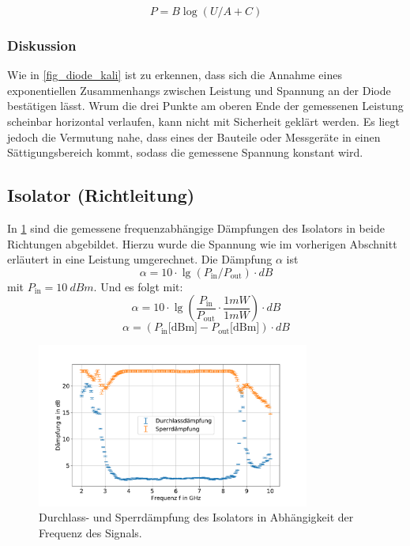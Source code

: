 \documentclass[
	a4paper,
	12pt,
	pagesize,
	ngerman
]{scrartcl}
\begin{document}
	\begin{equation}
		\label{eq_inv_kali}
		P = B\log{(U/A+C)}
	\end{equation}
	\subsubsection*{Diskussion}

	Wie in \cref{fig_diode_kali} ist zu erkennen, dass sich die Annahme eines exponentiellen Zusammenhangs zwischen Leistung und Spannung an der Diode bestätigen lässt.
	Wrum die drei Punkte am oberen Ende der gemessenen Leistung scheinbar horizontal verlaufen, kann nicht mit Sicherheit geklärt werden.
	Es liegt jedoch die Vermutung nahe, dass eines der Bauteile oder Messgeräte in einen Sättigungsbereich kommt, sodass die gemessene Spannung konstant wird.

	\subsection{Isolator (Richtleitung)}
	In \cref{fig_isolator} sind die gemessene frequenzabhängige Dämpfungen des Isolators in beide Richtungen abgebildet.
	Hierzu wurde die Spannung wie im vorherigen Abschnitt erläutert in eine Leistung umgerechnet.
	Die Dämpfung $\alpha$ ist
	\begin{equation}
		\alpha = 10 \cdot \lg{(P_{\text{in}}/P_{\text{out}})} \cdot \si{dB}
	\end{equation}
  mit $P_\text{in}=\SI{10}{dBm}$.
	Und es folgt mit:
	\begin{equation}
		\alpha = 10 \cdot \lg{\left(\frac{P_{\text{in}}}{P_{\text{out}}} \cdot \frac{1mW}{1mW}\right)} \cdot\si{dB}
	\end{equation}
	\begin{equation}
		\alpha = (P_\text{in} \text{[dBm]} - P_\text{out} \text{[dBm]} ) \cdot\si{dB}
	\end{equation}
	\begin{figure}[H]
		\includegraphics[width=0.8\textwidth]{img/isolator}
		\centering
		\caption{
		Durchlass- und Sperrdämpfung des Isolators in Abhängigkeit der Frequenz des Signals.
		}
		\label{fig_isolator}
		\centering
	\end{figure}
\end{document}
